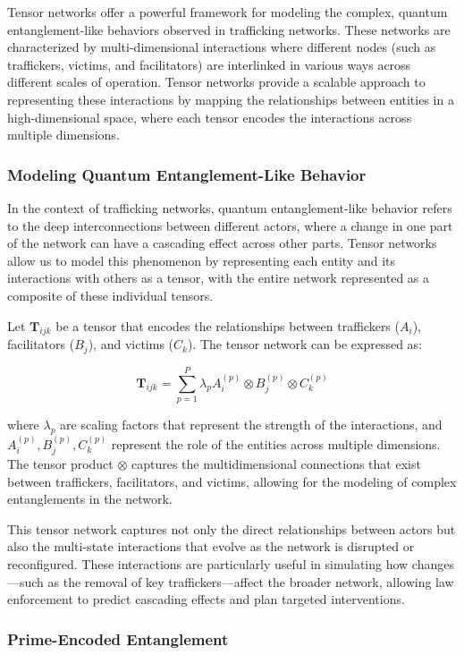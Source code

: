 \documentclass[%
 preprint, linenumbers,
 amsmath,amssymb,
 aps, physrev,
]{revtex4-2}
\begin{document}
Tensor networks offer a powerful framework for modeling the complex, quantum entanglement-like behaviors observed in trafficking networks. These networks are characterized by multi-dimensional interactions where different nodes (such as traffickers, victims, and facilitators) are interlinked in various ways across different scales of operation. Tensor networks provide a scalable approach to representing these interactions by mapping the relationships between entities in a high-dimensional space, where each tensor encodes the interactions across multiple dimensions.

\subsubsection{Modeling Quantum Entanglement-Like Behavior}

In the context of trafficking networks, quantum entanglement-like behavior refers to the deep interconnections between different actors, where a change in one part of the network can have a cascading effect across other parts. Tensor networks allow us to model this phenomenon by representing each entity and its interactions with others as a tensor, with the entire network represented as a composite of these individual tensors.

Let \(\mathbf{T}_{ijk}\) be a tensor that encodes the relationships between traffickers (\(A_i\)), facilitators (\(B_j\)), and victims (\(C_k\)). The tensor network can be expressed as:

\[
\mathbf{T}_{ijk} = \sum_{p=1}^{P} \lambda_p A_{i}^{(p)} \otimes B_{j}^{(p)} \otimes C_{k}^{(p)}
\]

where \(\lambda_p\) are scaling factors that represent the strength of the interactions, and \(A_i^{(p)}, B_j^{(p)}, C_k^{(p)}\) represent the role of the entities across multiple dimensions. The tensor product \(\otimes\) captures the multidimensional connections that exist between traffickers, facilitators, and victims, allowing for the modeling of complex entanglements in the network.

This tensor network captures not only the direct relationships between actors but also the multi-state interactions that evolve as the network is disrupted or reconfigured. These interactions are particularly useful in simulating how changes—such as the removal of key traffickers—affect the broader network, allowing law enforcement to predict cascading effects and plan targeted interventions.

\subsubsection{Prime-Encoded Entanglement}
\end{document}
